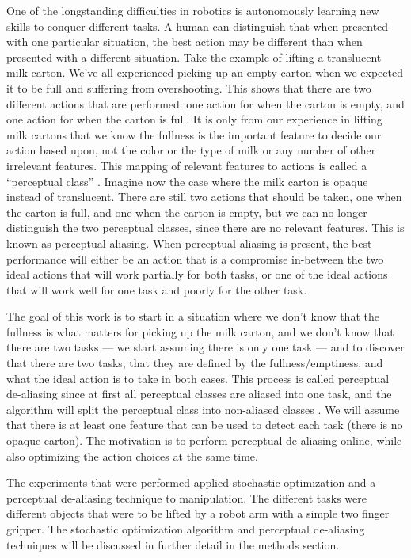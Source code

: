 \documentclass[12pt]{article}
\begin{document}
One of the longstanding difficulties in robotics is autonomously learning new skills to conquer different tasks. A human can distinguish that when presented with one particular situation, the best action may be different than when presented with a different situation. Take the example of lifting a translucent milk carton. We've all experienced picking up an empty carton when we expected it to be full and suffering from overshooting. This shows that there are two different actions that are performed: one action for when the carton is empty, and one action for when the carton is full. It is only from our experience in lifting milk cartons that we know the fullness is the important feature to decide our action based upon, not the color or the type of milk or any number of other irrelevant features. This mapping of relevant features to actions is called a ``perceptual class'' \cite{piater11learning}. Imagine now the case where the milk carton is opaque instead of translucent. There are still two actions that should be taken, one when the carton is full, and one when the carton is empty, but we can no longer distinguish the two perceptual classes, since there are no relevant features. This is known as perceptual aliasing. When perceptual aliasing is present, the best performance will either be an action that is a compromise in-between the two ideal actions that will work partially for both tasks, or one of the ideal actions that will work well for one task and poorly for the other task. 

The goal of this work is to start in a situation where we don't know that the fullness is what matters for picking up the milk carton, and we don't know that there are two tasks --- we start assuming there is only one task --- and to discover that there are two tasks, that they are defined by the fullness/emptiness, and what the ideal action is to take in both cases. This process is called perceptual de-aliasing since at first all perceptual classes are aliased into one task, and the algorithm will split the perceptual class into non-aliased classes \cite{daniel12learning}. We will assume that there is at least one feature that can be used to detect each task (there is no opaque carton). The motivation is to perform perceptual de-aliasing online, while also optimizing the action choices at the same time.

The experiments that were performed applied stochastic optimization and a perceptual de-aliasing technique to manipulation. The different tasks were different objects that were to be lifted by a robot arm with a simple two finger gripper. The stochastic optimization algorithm and perceptual de-aliasing techniques will be discussed in further detail in the methods section.
\end{document}
